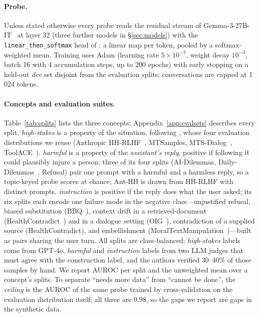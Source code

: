 \documentclass{article} %
\newcommand{\hs}{\emph{high-stakes}}
\newcommand{\harm}{\emph{harmful}}
\newcommand{\instr}{\emph{instruction}}
\begin{document}
\paragraph{Probe.}
Unless stated otherwise every probe reads the residual stream of Gemma-3-27B-IT~\citep{gemma3} at layer 32 (three further models in \S\ref{sec:models}) with the \texttt{linear\_then\_softmax} head of \citet{tuberlens}: a linear map per token, pooled by a softmax-weighted mean. Training uses Adam (learning rate $5\times10^{-3}$, weight decay $10^{-3}$, batch 16 with 4 accumulation steps, up to 200 epochs) with early stopping on a held-out \emph{dev} set disjoint from the evaluation splits; conversations are capped at 1\,024 tokens.

\paragraph{Concepts and evaluation suites.}
Table~\ref{tab:splits} lists the three concepts; Appendix~\ref{app:evalsets} describes every split. \hs{} is a property of the situation, following \citet{mckenzie2025highstakes}, whose four evaluation distributions we reuse (Anthropic HH-RLHF~\citep{bai2022training}, MTSamples, MTS-Dialog~\citep{benabacha2023mtsdialog}, ToolACE~\citep{liu2024toolace}). \harm{} is a property of the \emph{assistant's reply}, positive if following it could plausibly injure a person; three of its four splits (AI-Dilemmas, Daily-Dilemmas~\citep{chiu2024dailydilemmas}, Refusal) pair one prompt with a harmful and a harmless reply, so a topic-keyed probe scores at chance; Ant-HH is drawn from HH-RLHF with distinct prompts. \instr{} is positive if the reply does what the user asked; its six splits each encode one failure mode in the negative class---unjustified refusal, biased substitution (BBQ~\citep{parrish2022bbq}), context drift in a retrieved-document (HealthContradict~\citep{zhang2026healthcontradict}) and in a dialogue setting (OIG~\citep{laion2023oig}), contradiction of a supplied source (HealthContradict), and embellishment (MoralTextManipulation~\citep{greco2025moral})---built as pairs sharing the user turn. All splits are class-balanced; \hs{} labels come from GPT-4o, \harm{} and \instr{} labels from two LLM judges that must agree with the construction label, and the authors verified 30--40\% of those samples by hand. We report AUROC per split and the unweighted mean over a concept's splits. To separate ``needs more data'' from ``cannot be done'', the \emph{ceiling} is the AUROC of the same probe trained by cross-validation on the evaluation distribution itself; all three are 0.98, so the gaps we report are gaps in the synthetic data.
\end{document}
